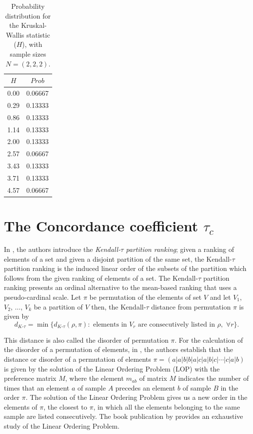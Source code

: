 \begin{table}[h]	\centering\footnotesize
\begin{tabular}{cc} 
   $H$   &$ Prob$           \\ \toprule
0.00 & 0.06667 \\ \cmidrule(l){1-2}
0.29 &0.13333\\\cmidrule(l){1-2}
0.86 & 0.13333\\\cmidrule(l){1-2}
1.14 & 0.13333\\\cmidrule(l){1-2}
2.00     &  0.13333\\\cmidrule(l){1-2}
2.57 & 0.06667\\\cmidrule(l){1-2}
3.43 & 0.13333\\\cmidrule(l){1-2}
3.71 & 0.13333 \\\cmidrule(l){1-2}
4.57 & 0.06667 \\  \bottomrule[0.2mm]
\end{tabular}
\caption{Probability distribution for the Kruskal-Wallis statistic ($H$), with sample sizes $N = (2,2,2)$.}
\label{t:prob_KW_222}
\end{table}

\section{The Concordance coefficient $\tau_c$} \label{sec:CC}

In \cite{Aparicio2020}, the authors introduce the \emph{Kendall-$\tau$ partition ranking};  given a ranking of elements of a set and given a disjoint partition of the same set, the Kendall-$\tau$ partition ranking is  the induced  linear order of the subsets of the partition which follows from the given ranking of elements of a set. The Kendall-$\tau$ partition ranking presents an ordinal alternative to the mean-based ranking that uses a pseudo-cardinal scale. Let  $\pi$ be permutation of the elements of set $V$ and let $V_1$, $V_2$, $\ldots$, $V_k$ be a partition of $V$ then, the Kendall-$\tau$ distance from permutation $\pi$ is given by 
$$ d_{K\text{-}\tau} = \displaystyle \min \{ d_{K\text{-}\tau}(\rho, \pi):\text{ elements in }V_r\text{ are consecutively listed in }\rho,\,\, \forall r \}.$$

This distance is also called the  disorder of permutation $\pi$. For the calculation of the disorder of a permutation of elements, in \cite{Aparicio2020}, the authors establish that the distance or disorder of a permutation of elements
$\pi = (a|a|b|b|a|c|a|b|c|\cdots|c|a|b)$ is given by the solution of the Linear Ordering Problem (LOP) with the preference matrix $M$, where the element $m_{ab}$ of matrix $M$ indicates the number of times that an element $a$ of sample $A$ precedes an element $b$ of sample $B$ in the order $\pi$. The solution of the Linear Ordering Problem gives us a new order in the elements of $\pi$, the closest to  $\pi$, in which all the elements belonging to the same sample are listed consecutively. The book publication by \cite{Marti2011} provides an exhaustive study of the Linear Ordering Problem. 

